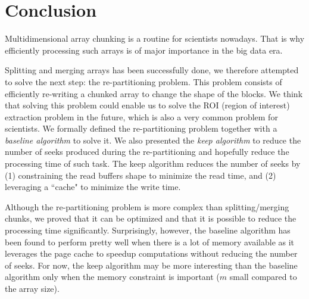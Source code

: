 \documentclass[sigconf, nonacm]{acmart}
\begin{document}

\section{Conclusion}

Multidimensional array chunking is a routine for scientists nowadays.
That is why efficiently processing such arrays is of major importance in the big data era.

Splitting and merging arrays has been successfully done, we therefore attempted
to solve the next step: the re-partitioning problem.
This problem consists of efficiently re-writing a chunked array to change the shape of the blocks.
We think that solving this problem could enable us to solve the ROI (region of interest)
extraction problem in the future, which is also a very common problem for scientists.
We formally defined the re-partitioning problem together with a \emph{baseline algorithm} to solve it.
We also presented the \emph{keep algorithm} to reduce the number of seeks produced during
the re-partitioning and hopefully reduce the processing time of such task.
The keep algorithm reduces the number of seeks by
(1) constraining the read buffers shape to minimize the read time, and
(2) leveraging a ``cache" to minimize the write time.

Although the re-partitioning problem is more complex than splitting/merging chunks,
we proved that it can be optimized and that it is possible to reduce the
processing time significantly.
Surprisingly, however, the baseline algorithm has been found to perform pretty
well when there is a lot of memory available as it leverages the page cache to
speedup computations without reducing the number of seeks.
For now, the keep algorithm may be more interesting than the baseline algorithm
only when the memory constraint is important ($m$ small compared to the array size).
\end{document}

